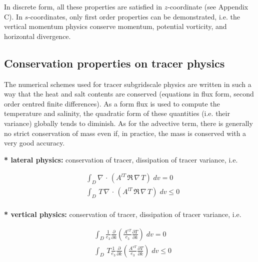 \documentclass[../tex_main/NEMO_manual]{subfiles}
\begin{document}
In discrete form, all these properties are satisfied in $z$-coordinate (see 
Appendix C). In $s$-coordinates, only first order properties can be 
demonstrated, i.e. the vertical momentum physics conserve momentum, 
potential vorticity, and horizontal divergence.

\subsection{Conservation properties on tracer physics}
\label{subsec:Invariant_tra_physics}

The numerical schemes used for tracer subgridscale physics are written in 
such a way that the heat and salt contents are conserved (equations in flux 
form, second order centred finite differences). As a form flux is used to 
compute the temperature and salinity, the quadratic form of these quantities 
(i.e. their variance) globally tends to diminish. As for the advective term, 
there is generally no strict conservation of mass even if, in practice, the 
mass is conserved with a very good accuracy. 

\textbf{* lateral physics: }conservation of tracer, dissipation of tracer 
variance, i.e.

\begin{equation} \label{eq:traldf_t_t2}
\begin{aligned}
&\int_D \nabla\, \cdot\, \left( A^{lT} \,\Re \,\nabla \,T \right)\;dv = 0 \\ 
&\int_D \,T\, \nabla\, \cdot\, \left( A^{lT} \,\Re \,\nabla \,T \right)\;dv \leq 0 \\ 
\end{aligned}
\end{equation}

\textbf{* vertical physics: }conservation of tracer, dissipation of tracer 
variance, i.e.

\begin{equation} \label{eq:trazdf_t_t2}
\begin{aligned}
& \int_D \frac{1}{e_3 } \frac{\partial }{\partial k}\left( \frac{A^{vT}}{e_3 }  \frac{\partial T}{\partial k}  \right)\;dv = 0 \\ 
& \int_D \,T \frac{1}{e_3 } \frac{\partial }{\partial k}\left( \frac{A^{vT}}{e_3 }  \frac{\partial T}{\partial k}  \right)\;dv \leq 0 \\ 
\end{aligned}
\end{equation}
\end{document}
